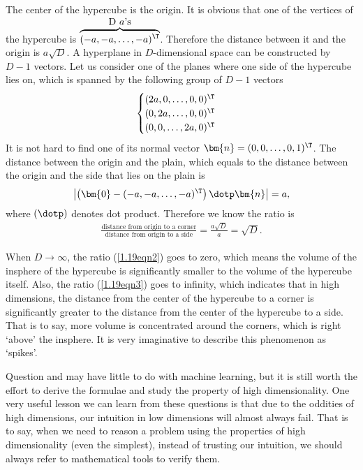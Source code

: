 \begin{answer}{}
	The center of the hypercube is the origin. It is obvious that one of the vertices of the hypercube is $\overbrace{(-a, -a, \ldots, -a)^{\T}}^{\mbox{D $a$'s}}$. Therefore the distance between it and the origin is $a\sqrt{D}$. A hyperplane in $D$-dimensional space can be constructed by $D-1$ vectors. Let us consider one of the planes where one side of the hypercube lies on, which is spanned by the following group of $D - 1$ vectors
	\begin{equation}
		\begin{cases}
			(2a, 0, \ldots, 0, 0)^{\T}\\
			(0, 2a, \ldots, 0, 0)^{\T}\\
			(0, 0, \ldots, 2a, 0)^{\T}
		\end{cases}
	\end{equation}
	It is not hard to find one of its normal vector $\bm{n} = (0, 0, \ldots, 0, 1)^{\T}$. The distance between the origin and the plain, which equals to the distance between the origin and the side that lies on the plain is
	\begin{align}
	\left\lvert \left(\bm{0} - (-a, -a, \ldots, -a)^{\T}\right) \dotp \bm{n} \right\rvert = a,
	\end{align}
	where $(\dotp)$ denotes dot product. Therefore we know the ratio is
	\begin{align}\label{1.19eqn3}
		\frac{\mbox{distance from origin to a corner}}{\mbox{distance from origin to a side}} = \frac{a\sqrt{D}}{a} = \sqrt{D}.
	\end{align}
	
	When $D \rightarrow \infty$, the ratio (\ref{1.19eqn2}) goes to zero, which means the volume of the insphere of the hypercube is significantly smaller to the volume of the hypercube itself. Also, the ratio (\ref{1.19eqn3}) goes to infinity, which indicates that in high dimensions, the distance from the center of the hypercube to a corner is significantly greater to the distance from the center of the hypercube to a side. That is to say, more volume is concentrated around the corners, which is right `above' the insphere. It is very imaginative to describe this phenomenon as `spikes'. 
\end{answer}

\begin{afternote}
	Question  and  may have little to do with machine learning, but it is still worth the effort to derive the formulae and study the property of high dimensionality. One very useful lesson we can learn from these questions is that due to the oddities of high dimensions, our intuition in low dimensions will almost always fail. That is to say, when we need to reason a problem using the properties of high dimensionality (even the simplest), instead of trusting our intuition, we should always refer to mathematical tools to verify them.
\end{afternote}